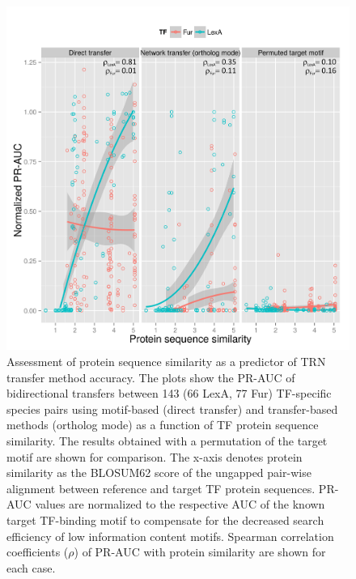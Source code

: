 \begin{figure}
  \centering
  \includegraphics[width=\textwidth]{figures/chapter3/protein-sequence-similarity}
  \caption{Assessment of protein sequence similarity as a predictor of TRN
    transfer method accuracy. The plots show the PR-AUC of bidirectional
    transfers between 143 (66 LexA, 77 Fur) TF-specific species pairs using
    motif-based (direct transfer) and transfer-based methods
    (ortholog mode) as a function of TF protein sequence
    similarity. The results obtained with a permutation of the target motif are
    shown for comparison. The x-axis denotes protein similarity as the BLOSUM62
    score of the ungapped pair-wise alignment between reference and target TF
    protein sequences. PR-AUC values are normalized to the respective AUC of
    the known target TF-binding motif to compensate for the decreased search
    efficiency of low information content motifs. Spearman correlation
    coefficients ($\rho$) of PR-AUC with protein similarity are shown for each
    case.}
\label{fig:protein-sequence-similarity}
\end{figure}

